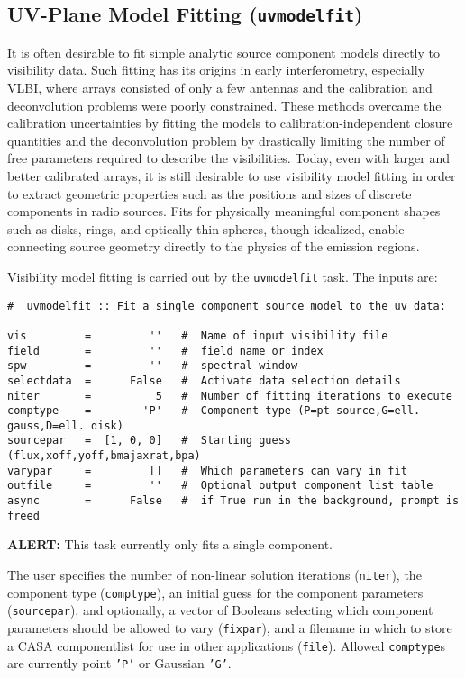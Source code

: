 \subsection{UV-Plane Model Fitting ({\tt uvmodelfit})}
\label{section:cal.other.uvmodelfit}

It is often desirable to fit simple analytic source component models
directly to visibility data.  Such fitting has its origins in early
interferometry, especially VLBI, where arrays consisted of only a few
antennas and the calibration and deconvolution problems were poorly
constrained.  These methods overcame the calibration uncertainties by
fitting the models to calibration-independent closure quantities and
the deconvolution problem by drastically limiting the number of free
parameters required to describe the visibilities.  Today, even with
larger and better calibrated arrays, it is still desirable to use
visibility model fitting in order to extract geometric properties such
as the positions and sizes of discrete components in radio sources.
Fits for physically meaningful component shapes such as disks, rings,
and optically thin spheres, though idealized, enable connecting source
geometry directly to the physics of the emission regions.

Visibility model fitting is carried out by the {\tt uvmodelfit} task.
The inputs are:
\small
\begin{verbatim}
#  uvmodelfit :: Fit a single component source model to the uv data:

vis         =         ''   #  Name of input visibility file
field       =         ''   #  field name or index
spw         =         ''   #  spectral window
selectdata  =      False   #  Activate data selection details
niter       =          5   #  Number of fitting iterations to execute
comptype    =        'P'   #  Component type (P=pt source,G=ell. gauss,D=ell. disk)
sourcepar   =  [1, 0, 0]   #  Starting guess (flux,xoff,yoff,bmajaxrat,bpa)
varypar     =         []   #  Which parameters can vary in fit
outfile     =         ''   #  Optional output component list table
async       =      False   #  if True run in the background, prompt is freed
\end{verbatim}
\normalsize
{\bf ALERT:} This task currently only fits a single component.

The user specifies the number of non-linear solution
iterations ({\tt niter}), the component type ({\tt comptype}), an
initial guess for the component parameters ({\tt sourcepar}), and
optionally, a vector of Booleans selecting which component parameters
should be allowed to vary ({\tt fixpar}), and a filename in which to
store a CASA componentlist for use in other applications ({\tt file}).
Allowed {\tt comptype}s are currently point {\tt 'P'} or
Gaussian {\tt 'G'}.

